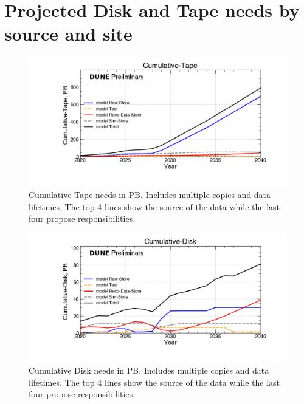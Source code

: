 \section{Projected Disk and Tape needs by source and site}
\begin{figure}[h]
\centering\includegraphics[height=0.4\textwidth]{DOE23-noNDLAr_2023-06-29-2040/DOE23-noNDLAr_2023-06-29-2040-Cumulative-Tape.png}
\caption{Cumulative Tape needs in PB. Includes multiple copies and data lifetimes. The top 4 lines show the source of the data while the last four propose responsibilities.}
\label{fig:Cumulative-Tape}
\end{figure}
\begin{figure}[h]
\centering\includegraphics[height=0.4\textwidth]{DOE23-noNDLAr_2023-06-29-2040/DOE23-noNDLAr_2023-06-29-2040-Cumulative-Disk.png}
\caption{Cumulative Disk needs in PB. Includes multiple copies and data lifetimes. The top 4 lines show the source of the data while the last four propose responsibilities.}
\label{fig:Cumulative-Disk}
\end{figure}
